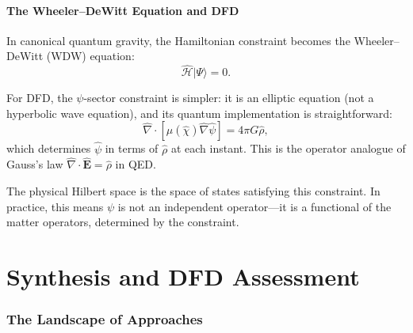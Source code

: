 \documentclass[12pt,a4paper]{article}
\begin{document}
\subsection{The Wheeler--DeWitt Equation and DFD}

In canonical quantum gravity, the Hamiltonian constraint becomes the Wheeler--DeWitt (WDW) equation:
\begin{equation}
\hat{\mathcal{H}}|\Psi\rangle = 0.
\end{equation}

For DFD, the $\psi$-sector constraint is simpler: it is an elliptic equation (not a hyperbolic wave equation), and its quantum implementation is straightforward:
\begin{equation}
\hat{\nabla}\cdot[\mu(\hat{\chi})\hat{\nabla}\hat{\psi}] = 4\pi G\hat{\rho},
\end{equation}
which determines $\hat{\psi}$ in terms of $\hat{\rho}$ at each instant. This is the operator analogue of Gauss's law $\hat{\nabla}\cdot\hat{\mathbf{E}} = \hat{\rho}$ in QED.

The physical Hilbert space is the space of states satisfying this constraint. In practice, this means $\psi$ is not an independent operator---it is a functional of the matter operators, determined by the constraint.


\part{Synthesis and DFD Assessment}
\label{sec:synthesis}

\section{The Landscape of Approaches}
\end{document}
